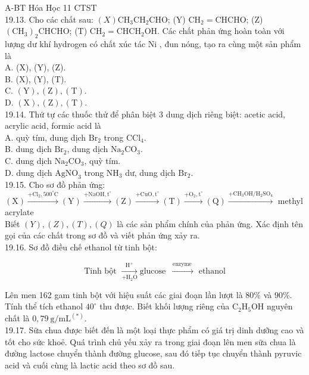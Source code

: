 \documentclass[10pt]{article}
\begin{document}
A-BT Hóa Học 11 CTST\\
19.13. Cho các chất sau: $(X) \mathrm{CH}_{3} \mathrm{CH}_{2} \mathrm{CHO}$; (Y) $\mathrm{CH}_{2}=\mathrm{CHCHO}$; (Z) $\left(\mathrm{CH}_{3}\right)_{2} \mathrm{CHCHO}$; (T) $\mathrm{CH}_{2}=\mathrm{CHCH}_{2} \mathrm{OH}$. Các chất phản ứng hoàn toàn với lượng dư khí hydrogen có chất xúc tác Ni , đun nóng, tạo ra cùng một sản phẩm là\\
A. (X), (Y), (Z).\\
B. (X), (Y), (T).\\
C. $(\mathrm{Y}),(\mathrm{Z}),(\mathrm{T})$.\\
D. $(\mathrm{X}),(\mathrm{Z}),(\mathrm{T})$.\\
19.14. Thứ tự các thuốc thử để phân biệt 3 dung dịch riêng biệt: acetic acid, acrylic acid, formic acid là\\
A. quỳ tím, dung dịch $\mathrm{Br}_{2}$ trong $\mathrm{CCl}_{4}$.\\
B. dung dịch $\mathrm{Br}_{2}$, dung dịch $\mathrm{Na}_{2} \mathrm{CO}_{3}$.\\
C. dung dịch $\mathrm{Na}_{2} \mathrm{CO}_{3}$, quỳ tím.\\
D. dung dịch $\mathrm{AgNO}_{3}$ trong $\mathrm{NH}_{3}$ dư, dung dịch $\mathrm{Br}_{2}$.\\
19.15. Cho sơ đồ phản ứng:\\
$(\mathrm{X}) \xrightarrow{+\mathrm{Cl}_{2}, 500^{\circ} \mathrm{C}}(\mathrm{Y}) \xrightarrow{+\mathrm{NaOH}, \mathrm{t}^{\circ}}(\mathrm{Z}) \xrightarrow{+\mathrm{CuO}, \mathrm{t}^{\circ}}(\mathrm{T}) \xrightarrow{+\mathrm{O}_{2}, \mathrm{t}^{\circ}}(\mathrm{Q}) \xrightarrow{+\mathrm{CH}_{3} \mathrm{OH} / \mathrm{H}_{2} \mathrm{SO}_{4}}$ methyl acrylate\\
Biết $(Y),(Z),(T),(Q)$ là các sản phẩm chính của phản ứng. Xác định tên gọi của các chất trong sơ đồ và viết phản ứng xảy ra.\\
19.16. Sơ đồ điều chế ethanol từ tinh bột:

$$
\text { Tinh bột } \xrightarrow[+\mathrm{H}_{2} \mathrm{O}]{\mathrm{H}^{+}} \text {glucose } \xrightarrow{\text { enzyme }} \text { ethanol }
$$

Lên men 162 gam tinh bột với hiệu suất các giai đoạn lần lượt là $80 \%$ và $90 \%$. Tính thể tích ethanol $40^{\circ}$ thu được. Biết khối lượng riêng của $\mathrm{C}_{2} \mathrm{H}_{5} \mathrm{OH}$ nguyên chất là $0,79 \mathrm{~g} / \mathrm{mL}^{(*)}$.\\
19.17. Sữa chua được biết đến là một loại thực phẩm có giá trị dinh dưỡng cao và tốt cho sức khoẻ. Quá trình chủ yếu xảy ra trong giai đoạn lên men sữa chua là đường lactose chuyển thành đường glucose, sau đó tiếp tục chuyển thành pyruvic acid và cuối cùng là lactic acid theo sơ đồ sau.
\end{document}
